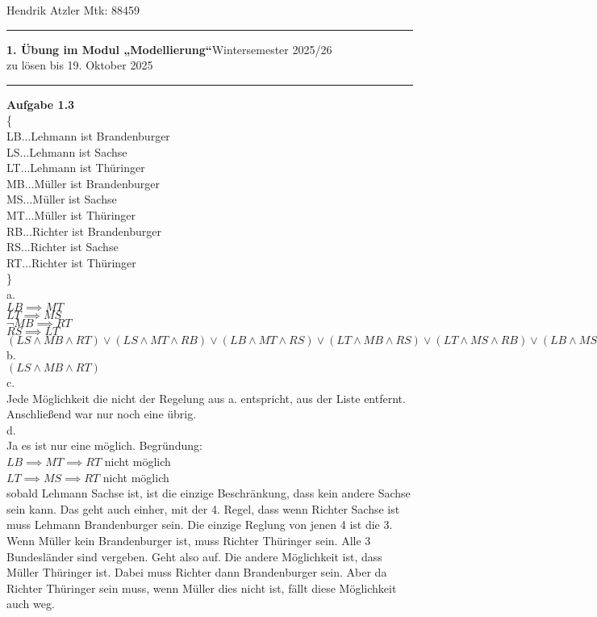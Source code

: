\documentclass[a4paper,12pt]{article}
\begin{document}
Hendrik Atzler \hfill Mtk: 88459

\rule{\textwidth}{0.4pt}


{\textbf{1. Übung im Modul „Modellierung“}\hfill Wintersemester 2025/26} \\
zu lösen bis 19. Oktober 2025 \\
\rule{\textwidth}{0.4pt}

{\large{\textbf{Aufgabe 1.3}}} \\

\{\\
LB...Lehmann ist Brandenburger \\
LS...Lehmann ist Sachse \\
LT...Lehmann ist Thüringer \\
MB...Müller ist Brandenburger \\
MS...Müller ist Sachse \\
MT...Müller ist Thüringer \\
RB...Richter ist Brandenburger \\
RS...Richter ist Sachse \\
RT...Richter ist Thüringer \\
\}\\

a.\\ 
$ LB \implies MT $ \\
$ LT \implies MS $ \\
$ \neg MB \implies RT $ \\
$  RS \implies LT $ \\

$ (LS \land MB \land RT) \lor (LS \land MT \land RB) \lor (LB \land MT \land RS) \lor (LT \land MB \land RS) \lor (LT \land MS \land RB) \lor (LB \land MS \land RT) $ \\

b. \\
$ (LS \land MB \land RT) $ \\

c. \\
Jede Möglichkeit die nicht der Regelung aus a. entspricht, aus der Liste entfernt. Anschließend war nur noch eine übrig.\\

d. \\
Ja es ist nur eine möglich.
Begründung: \\
$ LB \implies MT \implies RT $ nicht möglich \\
$ LT \implies MS \implies RT $ nicht möglich \\
sobald Lehmann Sachse ist, ist die einzige Beschränkung, dass kein andere Sachse sein kann. Das geht auch einher, mit der 4. Regel, dass wenn Richter Sachse ist muss Lehmann Brandenburger sein. Die einzige Reglung von jenen 4 ist die 3. Wenn Müller kein Brandenburger ist, muss Richter Thüringer sein. Alle 3 Bundesländer sind vergeben. Geht also auf. Die andere Möglichkeit ist, dass Müller Thüringer ist. Dabei muss Richter dann Brandenburger sein. Aber da Richter Thüringer sein muss, wenn Müller dies nicht ist, fällt diese Möglichkeit auch weg.
\end{document}
